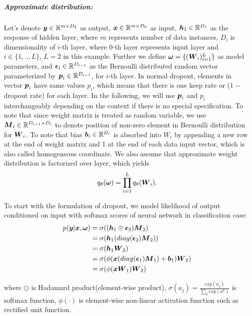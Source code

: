 \newpage %
\subparagraph{Approximate distribution:}
Let's denote $\boldsymbol y\in \mathbb R ^{m \times D_{2}}$ as output, $\boldsymbol x \in \mathbb R^{m \times D_{0}}$ as input, $\boldsymbol h_{1} \in \mathbb R^{D_{1}}$ as the response of hidden layer, where $m$ represents number of data instances, $D_{i}$ is dimensionality of $i$-th layer, where $0$-th layer represents input layer and $i \in \{1,..,L\}$, $L=2$ in this example. Further we define $\boldsymbol \omega = \{ (\boldsymbol W_{i})_{i=1}^{L}  \}$ as model parameters, and $\boldsymbol \epsilon_{i} \in \mathbb R^{D_{i-1}}$ as the Bernoulli distributed random vector parameterized by $\boldsymbol p_{i} \in \mathbb R^{D_{i-1}}$, for $i$-th layer. In normal dropout, elements in vector $\boldsymbol p_{i}$ have same values $p_{i}$, which means that there is one keep rate or ($1-$dropout rate) for each layer. In the following, we will use $\boldsymbol p_{i}$ and $p_{i}$ interchangeably depending on the context if there is no special specification. To note that since weight matrix is treated as random variable, we use $\boldsymbol M_{i} \in \mathbb R^{D_{i-1} \times D_{i}}$ to denote position of non-zero element in Bernoulli distribution for $\boldsymbol W_{i}$. To note that bias $\boldsymbol b_{i} \in \mathbb R^{D_{i}}$ is absorbed into $W_{i}$ by appending a new row at the end of weight matrix and 1 at the end of each data input vector, which is also called homogeneous coordinate. We also assume that approximate weight distribution is factorized over layer, which yields
\[
q_{\theta}(\boldsymbol \omega) = \prod_{i=1}^{L}q_{\theta}(\boldsymbol W_{i}). 
\]

To start with the formulation of dropout, we model likelihood of output conditioned on input with softmax scores of neural network in classification case:
\begin{equation}
\begin{aligned} \label{dropout_form}
p(\boldsymbol y| \boldsymbol x, \boldsymbol \omega) & = \sigma((\boldsymbol h_{1} \odot \boldsymbol \epsilon_{2}) \boldsymbol M_{2})\\
& = \sigma(\boldsymbol h_{1} (diag(\boldsymbol \epsilon_{2}) \boldsymbol M_{2})) \\
& = \sigma(\boldsymbol h_{1} \boldsymbol W_{2}) \\
& = \sigma(\phi(\boldsymbol x (diag(\boldsymbol \epsilon_{1}) \boldsymbol M_{1})+ \boldsymbol b_{1}) \boldsymbol W_{2}) \\
& = \sigma(\phi(\boldsymbol x \boldsymbol W_{1})\boldsymbol W_{2})
\end{aligned}
\end{equation}

where $\odot$ is Hadamard product(element-wise product), $\sigma(a_{j}) = \frac{exp({a_{j}})}{\sum_{k}exp({a^{k}})}$ is softmax function, $\phi(\cdot)$ is element-wise non-linear activation function such as rectified unit function.


